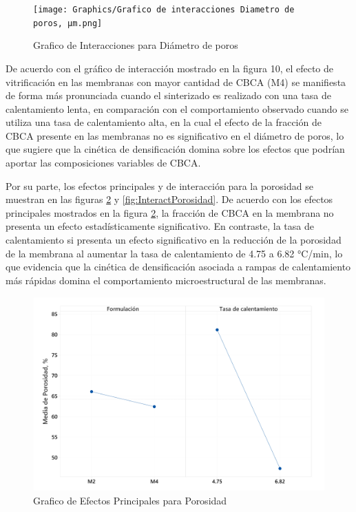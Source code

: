 \documentclass{article}
\begin{document}
\begin{figure}[ht]
    \centering
    \texttt{[image: Graphics/Grafico de interacciones Diametro de poros, μm.png]}
    \caption{Grafico de Interacciones para Diámetro de poros}
    \label{fig:InteractDiametroPoros}
\end{figure}

De acuerdo con el gráfico de interacción mostrado en la figura 10, 
el efecto de vitrificación en las membranas con mayor cantidad de 
CBCA (M4) se manifiesta de forma más pronunciada cuando el 
sinterizado es realizado con una tasa de calentamiento lenta, 
en comparación con el comportamiento observado cuando se utiliza una 
tasa de calentamiento alta, en la cual el efecto de la fracción de 
CBCA presente en las membranas no es significativo en el diámetro de 
poros, lo que sugiere que la cinética de densificación domina sobre 
los efectos que podrían aportar las composiciones variables de CBCA. 

Por su parte, los efectos principales y de interacción para la porosidad 
se muestran en las figuras \ref{fig:EfectosPrinPorosidad} y \ref{fig:InteractPorosidad}. 
De acuerdo con los efectos principales mostrados en la figura \ref{fig:EfectosPrinPorosidad}, 
la fracción de CBCA en la membrana no presenta un efecto 
estadísticamente significativo. 
En contraste, la tasa de calentamiento si presenta un efecto 
significativo en la reducción de la porosidad de la membrana al 
aumentar la tasa de calentamiento de 4.75 a 6.82 °C/min, lo que 
evidencia que la cinética de densificación asociada a rampas de 
calentamiento más rápidas domina el comportamiento microestructural 
de las membranas.

\begin{figure}[ht]
    \centering
    \includegraphics[width=0.7\linewidth]{Graphics/Grafico de efectos principales de Porosidad.png}
    \caption{Grafico de Efectos Principales para Porosidad}
    \label{fig:EfectosPrinPorosidad}
\end{figure}
\end{document}
